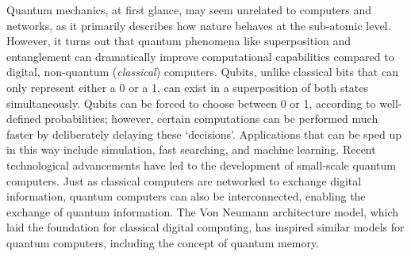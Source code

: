 



Quantum mechanics, at first glance, may seem unrelated to computers and networks, as it primarily describes how nature behaves at the sub-atomic level.
However, it turns out that quantum phenomena like superposition and entanglement can dramatically improve computational capabilities compared to digital, non-quantum (\textit{classical}) computers.
Qubits, unlike classical bits that can only represent either a 0 or a 1, can exist in a superposition of both states simultaneously.
Qubits can be forced to choose between 0 or 1, according to well-defined probabilities;
however, certain computations can be performed much faster by deliberately delaying these `decisions'.
Applications that can be sped up in this way include simulation, fast searching, and machine learning.
Recent technological advancements have led to the development of small-scale quantum computers.
Just as classical computers are networked to exchange digital information, quantum computers can also be interconnected, enabling the exchange of quantum information.
The Von Neumann architecture model, which laid the foundation for classical digital computing, has inspired similar models for quantum computers, including the concept of quantum memory.


